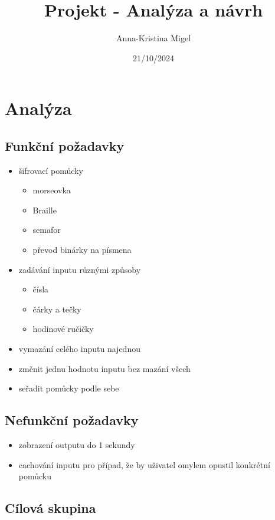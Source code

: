 \documentclass{article}
\title{Projekt - Analýza a návrh}
\author{Anna-Kristina Migel}
\date{21/10/2024}
\begin{document}
\maketitle{}

\section{Analýza}

\subsection{Funkční požadavky}

\begin{itemize}
    \item šifrovací pomůcky
        \begin{itemize}
            \item morseovka
            \item Braille
            \item semafor
            \item převod binárky na písmena
        \end{itemize}
   \item zadávání inputu různými způsoby
       \begin{itemize}
            \item čísla
            \item čárky a tečky
            \item hodinové ručičky
        \end{itemize}
    \item vymazání celého inputu najednou
    \item změnit jednu hodnotu inputu bez mazání všech
    \item seřadit pomůcky podle sebe
\end{itemize}

\subsection{Nefunkční požadavky}

\begin{itemize}
    \item zobrazení outputu do 1 sekundy
    \item cachování inputu pro případ, že by uživatel omylem opustil konkrétní pomůcku
\end{itemize}

\subsection{Cílová skupina}
\end{document}

